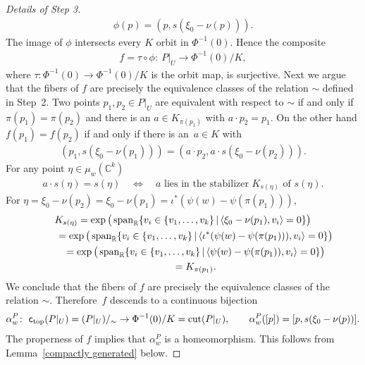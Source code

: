 \documentclass[10pt,a4paper]{amsart}
\numberwithin{equation}{section}
\begin{document}
\begin{proof}[Details of Step 3]
\begin{gather*}
     \phi(p) = (p, s (\xi_0 - \nu(p))).
\end{gather*}
The image of $\phi$
intersects every $K$ orbit in $\Phi^{-1} (0)$.  Hence the composite
\begin{gather*}
f = \tau\circ \phi\colon \ P|_U\to \Phi^{-1} (0)/K,
\end{gather*}
where $\tau\colon  \Phi^{-1} (0)\to \Phi^{-1} (0)/K$ is the orbit map, is
surjective.  Next we argue that the f\/ibers of $f$ are precisely
the equivalence classes of the relation $\sim$ def\/ined in Step~2.
Two points $p_1, p_2\in P|_U$ are equivalent
with respect to $\sim$ if and only if $\pi (p_1) = \pi(p_2)$ and there
is an $a\in K_{\pi (p_1)}$ with $a\cdot p_2 = p_1$.  On the other hand
$f(p_1) = f(p_2)$ if and only if there is an~$a\in K$ with
\begin{gather*}
(p_1,  s (\xi_0 - \nu(p_1))) = (a\cdot p_2, a\cdot s(\xi_0 - \nu(p_2))).
\end{gather*}
For any point $\eta\in \mu_w({\mathbb C}^k)$
\begin{gather*}
a\cdot s(\eta) = s(\eta) \quad \Leftrightarrow \quad a
  \textrm{ lies in the stabilizer }K_{s(\eta)}\textrm{ of } s(\eta).
\end{gather*}
For $\eta = \xi_0 -\nu(p_2) =\xi_0 -\nu(p_1)
 =  \iota^*(\psi(w)-\psi (\pi(p_1)))$,
\begin{gather*}
K_{s(\eta)}  =  \exp \big(\operatorname{span}_{\mathbb R} \{v_i \in \{v_1,\ldots, v_k\} \,|\, \langle
  \xi_0 - \nu(p_1), v_i\rangle = 0\}\big)\\
 \hphantom{K_{s(\eta)}}{}
 =  \exp \big(\operatorname{span}_{\mathbb R} \{v_i \in \{v_1,\ldots, v_k\} \,|\, \langle
  \iota^*(\psi(w)- \psi (\pi(p_1))) , v_i\rangle = 0\}\big)\\
\hphantom{K_{s(\eta)}}{} =  \exp \big(\operatorname{span}_{\mathbb R} \{v_i \in \{v_1,\ldots, v_k\} \,|\, \langle
  \psi(w)- \psi (\pi(p_1)), v_i\rangle = 0\}\big) \\
\hphantom{K_{s(\eta)}}{} =  K_{\pi(p_1)}.
\end{gather*}
We conclude that the f\/ibers of $f$ are precisely
the equivalence classes of the relation $\sim$.
Therefo\-re~$f$ descends to a continuous bijection
\begin{gather*}
\alpha^P_w\colon  \  {\textsf{c}_{\rm top}} (P|_U)=(P|_U)/_{\sim}   \to
   \Phi^{-1} (0)/K= \operatorname{cut}(P|_U), \qquad \alpha^P_w([p])=[p,s(\xi_0 - \nu(p))] .
\end{gather*}
The properness of $f$ implies that $\alpha^P_w$ is a homeomorphism.
This follows from Lemma~\ref{compactly generated} below.


\end{proof}
\end{document}
